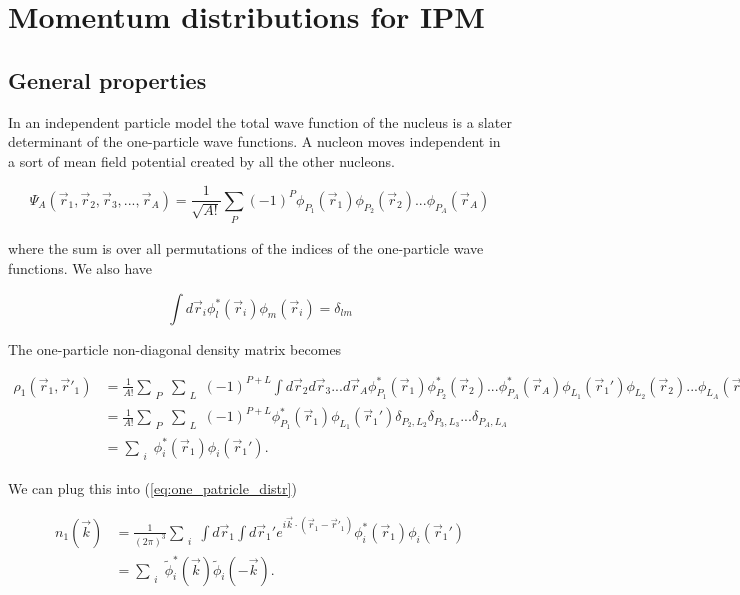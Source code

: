 \documentclass[12pt]{article}
\begin{document}
\section{Momentum distributions for IPM}
\subsection{General properties}

In an independent particle model the total wave function of the nucleus is a slater determinant of the one-particle wave functions. A nucleon moves independent in a sort of mean field potential created by all the other nucleons. 

\begin{equation} \label{eq:slater}
\Psi_A(\vec{r}_1,\vec{r}_2,\vec{r}_3, ... ,\vec{r}_A)= \frac{1}{\sqrt{A!}} \sum_{\substack{P}} 
													  (-1)^P \phi_{P_1}(\vec{r}_1)
													         \phi_{P_2}(\vec{r}_2)...
													         \phi_{P_A}(\vec{r}_A)
\end{equation}

where the sum is over all permutations of the indices of the one-particle wave functions. We also have 

\begin{equation} \label{eq:orthogonality}
\int d\vec{r}_i \phi^*_l(\vec{r}_i)\phi_m(\vec{r}_i) = \delta_{lm}
\end{equation}

The one-particle non-diagonal density matrix becomes

\begin{align}
\rho_1(\vec{r}_1,\vec{r}'_1) & = \frac{1}{A!} 	 \sum_{\substack{P}} \sum_{\substack{L}} (-1)^{P+L} \int d\vec{r}_2 d\vec{r}_3 ... d\vec{r}_A 
\phi^*_{P_1}(\vec{r}_1)\phi^*_{P_2}(\vec{r}_2)...\phi^*_{P_A}(\vec{r}_A)
\phi_{L_1}(\vec{r}_1')\phi_{L_2}(\vec{r}_2)...\phi_{L_A}(\vec{r}_A) \\
&  = \frac{1}{A!} 	 \sum_{\substack{P}} \sum_{\substack{L}} (-1)^{P+L} \phi^*_{P_1}(\vec{r}_1) \phi_{L_1}(\vec{r}_1') 
\delta_{P_2,L_2}\delta_{P_3,L_3}...\delta_{P_A,L_A} \\
& = \sum_{\substack{i}} \phi^*_i(\vec{r}_1) \phi_i(\vec{r}_1').
\end{align}

We can plug this into (\ref{eq:one_patricle_distr})

\begin{align} 
	n_1(\vec{k})&=\frac{1}{(2\pi)^3} \sum_{\substack{i}} \int d\vec{r}_1 \int d\vec{r}_1' e^{i\vec{k}\cdot (\vec{r}_1-\vec{r}'_1)}
	\phi^*_i(\vec{r}_1)\phi_i(\vec{r}_1') \\
	& = \sum_{\substack{i}} \tilde{\phi}^*_i(\vec{k})\tilde{\phi}_i(-\vec{k}).
\end{align}
\end{document}
